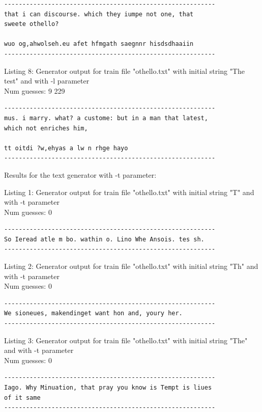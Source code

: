 \documentclass{article}
\begin{document}
\begin{lstlisting}
----------------------------------------------------------
that i can discourse. which they iumpe not one, that 
sweete othello?

wuo og,ahwolseh.eu afet hfmgath saegnnr hisdsdhaaiin
----------------------------------------------------------
\end{lstlisting}

Listing 8: Generator output for train file "othello.txt" with initial string "The test" and with -l parameter
\\Num guesses: 9 229

\begin{lstlisting}
----------------------------------------------------------
mus. i marry. what? a custome: but in a man that latest, 
which not enriches him,

tt oitdi ?w,ehyas a lw n rhge hayo
----------------------------------------------------------
\end{lstlisting}



Results for the text generator with -t parameter:


\hfill

Listing 1: Generator output for train file "othello.txt" with initial string "T" and with -t parameter
\\Num guesses: 0

\begin{lstlisting}
----------------------------------------------------------
So Ieread atle m bo. wathin o. Lino Whe Ansois. tes sh.
----------------------------------------------------------
\end{lstlisting}

Listing 2: Generator output for train file "othello.txt" with initial string "Th" and with -t parameter
\\Num guesses: 0

\begin{lstlisting}
----------------------------------------------------------
We sioneues, makendinget want hon and, youry her.
----------------------------------------------------------
\end{lstlisting}

Listing 3: Generator output for train file "othello.txt" with initial string "The" and with -t parameter
\\Num guesses: 0

\begin{lstlisting}
----------------------------------------------------------
Iago. Why Minuation, that pray you know is Tempt is liues 
of it same
----------------------------------------------------------
\end{lstlisting}
\end{document}
